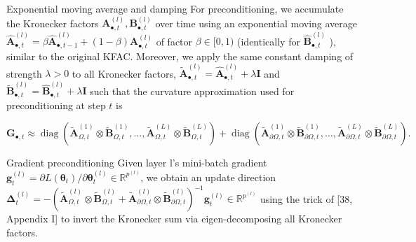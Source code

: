 \documentclass[10pt]{article}
\begin{document}
Exponential moving average and damping For preconditioning, we accumulate the Kronecker factors $\boldsymbol{A}_{\bullet, t}^{(l)}, \boldsymbol{B}_{\bullet, t}^{(l)}$ over time using an exponential moving average $\hat{\boldsymbol{A}}_{\bullet, t}^{(l)}=\beta \hat{\boldsymbol{A}}_{\bullet, t-1}^{(l)}+(1-\beta) \boldsymbol{A}_{\bullet, t}^{(l)}$ of factor $\beta \in[0,1)$ (identically for $\hat{\boldsymbol{B}}_{\bullet, t}^{(l)}$ ), similar to the original KFAC. Moreover, we apply the same constant damping of strength $\lambda>0$ to all Kronecker factors, $\tilde{\boldsymbol{A}}_{\bullet, t}^{(l)}=\hat{\boldsymbol{A}}_{\bullet, t}^{(l)}+\lambda \boldsymbol{I}$ and $\tilde{\boldsymbol{B}}_{\bullet, t}^{(l)}=\hat{\boldsymbol{B}}_{\bullet, t}^{(l)}+\lambda \boldsymbol{I}$ such that the curvature approximation used for preconditioning at step $t$ is

$$
\boldsymbol{G}_{\bullet, t} \approx \operatorname{diag}\left(\tilde{\boldsymbol{A}}_{\Omega, t}^{(1)} \otimes \tilde{\boldsymbol{B}}_{\Omega, t}^{(1)}, \ldots, \tilde{\boldsymbol{A}}_{\Omega, t}^{(L)} \otimes \tilde{\boldsymbol{B}}_{\Omega, t}^{(L)}\right)+\operatorname{diag}\left(\tilde{\boldsymbol{A}}_{\partial \Omega, t}^{(1)} \otimes \tilde{\boldsymbol{B}}_{\partial \Omega, t}^{(1)}, \ldots, \tilde{\boldsymbol{A}}_{\partial \Omega, t}^{(L)} \otimes \tilde{\boldsymbol{B}}_{\partial \Omega, t}^{(L)}\right) .
$$

Gradient preconditioning Given layer l's mini-batch gradient $\boldsymbol{g}_{t}^{(l)}=\partial L\left(\boldsymbol{\theta}_{t}\right) / \partial \boldsymbol{\theta}_{t}^{(l)} \in \mathbb{R}^{p^{(l)}}$, we obtain an update direction $\boldsymbol{\Delta}_{t}^{(l)}=-\left(\tilde{\boldsymbol{A}}_{\Omega, t}^{(l)} \otimes \tilde{\boldsymbol{B}}_{\Omega, t}^{(l)}+\tilde{\boldsymbol{A}}_{\partial \Omega, t}^{(l)} \otimes \tilde{\boldsymbol{B}}_{\partial \Omega, t}^{(l)}\right)^{-1} \boldsymbol{g}_{t}^{(l)} \in \mathbb{R}^{p^{(l)}}$ using the trick of [38, Appendix I] to invert the Kronecker sum via eigen-decomposing all Kronecker factors.
\end{document}
